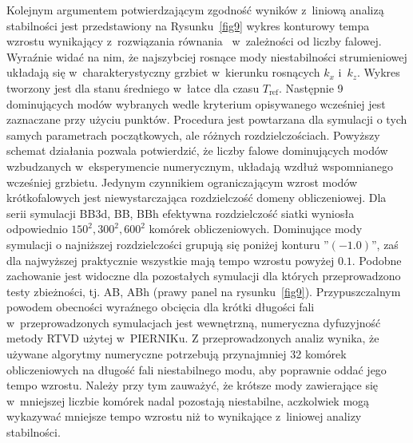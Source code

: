 \par Kolejnym argumentem potwierdzającym zgodność wyników z~liniową analizą
stabilności jest przedstawiony na Rysunku~\ref{fig9} wykres konturowy tempa
wzrostu wynikający z~rozwiązania równania~ w~zależności od
liczby falowej. Wyraźnie widać na nim, że najszybciej rosnące mody
niestabilności strumieniowej układają się w~charakterystyczny grzbiet w~kierunku
rosnących $k_x$ i~$k_z$.  Wykres tworzony jest dla stanu średniego w~łatce dla
czasu $T_{\textrm{ref}}$.  Następnie 9 dominujących modów wybranych wedle
kryterium opisywanego wcześniej jest zaznaczane przy użyciu punktów. Procedura
jest powtarzana dla symulacji o tych samych parametrach początkowych, ale
różnych rozdzielczościach.  Powyższy schemat działania pozwala potwierdzić, że
liczby falowe dominujących modów wzbudzanych w~eksperymencie numerycznym,
układają wzdłuż wspomnianego wcześniej grzbietu. Jedynym czynnikiem
ograniczającym wzrost modów krótkofalowych jest niewystarczająca rozdzielczość
domeny obliczeniowej. Dla serii symulacji BB3d, BB, BBh efektywna rozdzielczość
siatki wyniosła odpowiednio $150^2, 300^2, 600^2$ komórek obliczeniowych.
Dominujące mody symulacji o najniższej rozdzielczości grupują się poniżej
konturu ''$(-1.0)$'', zaś dla najwyższej praktycznie wszystkie mają tempo
wzrostu powyżej $0.1$. Podobne zachowanie jest widoczne dla pozostałych
symulacji dla których przeprowadzono testy zbieżności, tj. AB, ABh (prawy panel
na rysunku~\ref{fig9}). Przypuszczalnym powodem obecności wyraźnego obcięcia dla
krótki długości fali w~przeprowadzonych symulacjach jest wewnętrzną, numeryczna
dyfuzyjność metody RTVD użytej w~PIERNIKu. Z przeprowadzonych analiz wynika, że
używane algorytmy numeryczne potrzebują przynajmniej 32 komórek obliczeniowych
na długość fali niestabilnego modu, aby poprawnie oddać jego tempo wzrostu.
Należy przy tym zauważyć, że krótsze mody zawierające się w~mniejszej liczbie
komórek nadal pozostają niestabilne, aczkolwiek mogą wykazywać mniejsze tempo
wzrostu niż to wynikające z~liniowej analizy stabilności.

